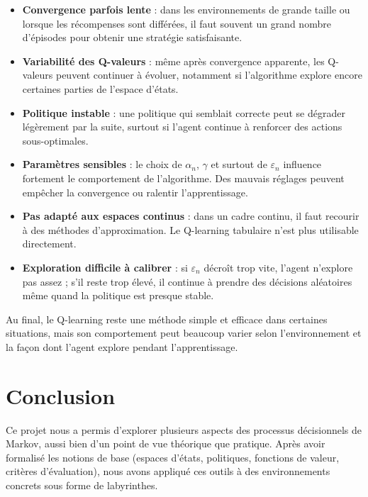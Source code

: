 \documentclass[12pt]{article}
\begin{document}
\begin{itemize}
    \item \textbf{Convergence parfois lente} : dans les environnements de grande taille ou lorsque les récompenses sont différées, il faut souvent un grand nombre d’épisodes pour obtenir une stratégie satisfaisante.

    \item \textbf{Variabilité des Q-valeurs} : même après convergence apparente, les Q-valeurs peuvent continuer à évoluer, notamment si l’algorithme explore encore certaines parties de l’espace d’états.

    \item \textbf{Politique instable} : une politique qui semblait correcte peut se dégrader légèrement par la suite, surtout si l’agent continue à renforcer des actions sous-optimales.

    \item \textbf{Paramètres sensibles} : le choix de \(\alpha_n\), \(\gamma\) et surtout de \(\varepsilon_n\) influence fortement le comportement de l’algorithme. Des mauvais réglages peuvent empêcher la convergence ou ralentir l’apprentissage.

    \item \textbf{Pas adapté aux espaces continus} : dans un cadre continu, il faut recourir à des méthodes d’approximation. Le Q-learning tabulaire n’est plus utilisable directement.

    \item \textbf{Exploration difficile à calibrer} : si \(\varepsilon_n\) décroît trop vite, l’agent n’explore pas assez ; s’il reste trop élevé, il continue à prendre des décisions aléatoires même quand la politique est presque stable.
\end{itemize}


Au final, le Q-learning reste une méthode simple et efficace dans certaines situations, mais son comportement peut beaucoup varier selon l’environnement et la façon dont l’agent explore pendant l’apprentissage.


\section*{Conclusion}

Ce projet nous a permis d’explorer plusieurs aspects des processus décisionnels de Markov, aussi bien d’un point de vue théorique que pratique. Après avoir formalisé les notions de base (espaces d’états, politiques, fonctions de valeur, critères d’évaluation), nous avons appliqué ces outils à des environnements concrets sous forme de labyrinthes.
\end{document}

